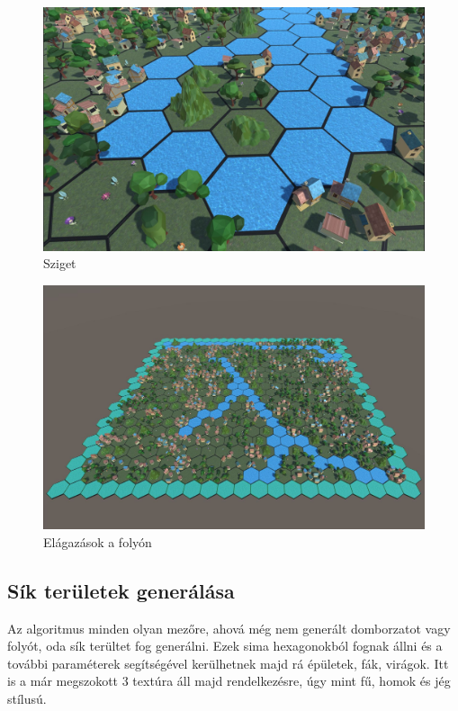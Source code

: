 \begin{figure}[h!]
\centering
\includegraphics[scale=0.3]{kepek/Island.JPG}
\caption{Sziget}
\label{fig:Island}
\end{figure}

\begin{figure}[h!]
\centering
\includegraphics[scale=0.3]{kepek/Branch.JPG}
\caption{Elágazások a folyón}
\label{fig:Branch}
\end{figure}

\subsection{Sík területek generálása}

Az algoritmus minden olyan mezőre, ahová még nem generált domborzatot vagy folyót, oda sík terültet fog generálni. Ezek sima hexagonokból fognak állni és a további paraméterek segítségével kerülhetnek majd rá épületek, fák, virágok. Itt is a már megszokott 3 textúra áll majd rendelkezésre, úgy mint fű, homok és jég stílusú.

